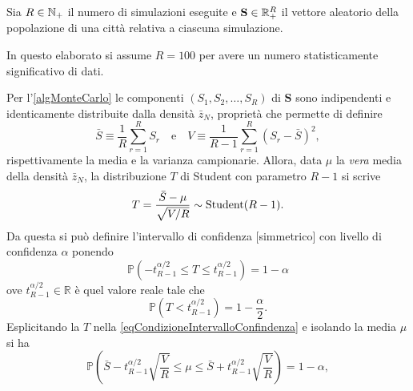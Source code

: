       Sia \(R\in\mathbb N_+\) il numero di simulazioni eseguite e \(\mathbf S\in\mathbb R_+^R\) il vettore aleatorio della popolazione di una città relativa a ciascuna simulazione.\nobreak
      \begin{ipo}
        In questo elaborato si assume \(R=100\) per avere un numero statisticamente significativo di dati.
      \end{ipo}\nobreak
      Per l'\cref{algMonteCarlo} le componenti \((S_1,S_2,\ldots,S_R)\) di \(\mathbf S\) sono indipendenti e identicamente distribuite dalla densità \(\bar z_N\), proprietà che permette di definire\nobreak
      \begin{equation*}
        \bar S\equiv\frac1R\sum_{r=1}^RS_r
        \hspace{1em}\text{e}\hspace{1em}
        V\equiv\frac1{R-1}\sum_{r=1}^R(S_r-\bar S)^2,
      \end{equation*}
      rispettivamente la media e la varianza campionarie. Allora, data \(\mu\) la \textit{vera}\footnotemark{} media della densità \(\bar z_N\), la distribuzione \(T\) di Student con parametro \(R-1\) si scrive%
      \begin{equation*}
        T=\frac{\bar S-\mu}{\sqrt{V/R}}\sim\operatorname{Student}(R-1).
      \end{equation*}
      Da questa si può definire l'intervallo di confidenza [simmetrico] con livello di confidenza \(\alpha\) ponendo
      \begin{equation}
        \label{eqCondizioneIntervalloConfindenza}
        \mathbb P\left(-t_{R-1}^{\alpha/2}\leq T\leq t_{R-1}^{\alpha/2}\right)=1-\alpha
      \end{equation}
      ove \(t_{R-1}^{\alpha/2}\in\mathbb R\) è quel valore reale tale che
      \begin{equation*}
        \mathbb P\left(T<t_{R-1}^{\alpha/2}\right)=1-\frac\alpha2.
      \end{equation*}
      Esplicitando la \(T\) nella \cref{eqCondizioneIntervalloConfindenza} e isolando la media \(\mu\) si ha
      \begin{equation*}
        \mathbb P\left(
          \bar S-t_{R-1}^{\alpha/2}\sqrt{\frac VR}
          \leq\mu\leq
          \bar S+t_{R-1}^{\alpha/2}\sqrt{\frac VR}
        \right)=1-\alpha,
      \end{equation*}
